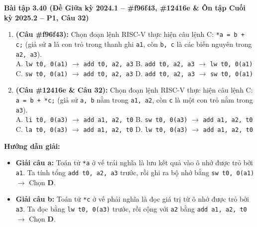 \textbf{Bài tập 3.40 (Đề Giữa kỳ 2024.1 -- \#f96f43, \#12416e \& Ôn tập Cuối kỳ 2025.2 -- P1, Câu 32)}
\begin{enumerate}[label=\alph*)]
    \item \textbf{(Câu \#f96f43):} Chọn đoạn lệnh RISC-V thực hiện câu lệnh C: \texttt{*a = b + c;} (giả sử \texttt{a} là con trỏ trong thanh ghi \texttt{a1}, còn \texttt{b, c} là các biến nguyên trong \texttt{a2, a3}).\\
    A. \texttt{lw t0, 0(a1)} $\rightarrow$ \texttt{add t0, a2, a3} \qquad B. \texttt{add t0, a2, a3} $\rightarrow$ \texttt{lw t0, 0(a1)}\\
    C. \texttt{sw t0, 0(a1)} $\rightarrow$ \texttt{add t0, a2, a3} \qquad D. \texttt{add t0, a2, a3} $\rightarrow$ \texttt{sw t0, 0(a1)}
    \item \textbf{(Câu \#12416e \& Câu 32):} Chọn đoạn lệnh RISC-V thực hiện câu lệnh C: \texttt{a = b + *c;} (giả sử \texttt{a, b} nằm trong \texttt{a1, a2}, còn \texttt{c} là một con trỏ nằm trong \texttt{a3}).\\
    A. \texttt{li t0, 0(a3)} $\rightarrow$ \texttt{add a1, a2, t0} \qquad B. \texttt{sw t0, 0(a3)} $\rightarrow$ \texttt{add a1, a2, t0}\\
    C. \texttt{la t0, 0(a3)} $\rightarrow$ \texttt{add a1, a2, t0} \qquad D. \texttt{lw t0, 0(a3)} $\rightarrow$ \texttt{add a1, a2, t0}
\end{enumerate}
\textbf{Hướng dẫn giải:}
\begin{itemize}
    \item \textbf{Giải câu a:} Toán tử \texttt{*a} ở vế trái nghĩa là lưu kết quả vào ô nhớ được trỏ bởi \texttt{a1}. Ta tính tổng \texttt{add t0, a2, a3} trước, rồi ghi ra bộ nhớ bằng \texttt{sw t0, 0(a1)} $\rightarrow$ Chọn \textbf{D}.
    \item \textbf{Giải câu b:} Toán tử \texttt{*c} ở vế phải nghĩa là đọc giá trị từ ô nhớ được trỏ bởi \texttt{a3}. Ta đọc bằng \texttt{lw t0, 0(a3)} trước, rồi cộng với \texttt{a2} bằng \texttt{add a1, a2, t0} $\rightarrow$ Chọn \textbf{D}.
\end{itemize}

